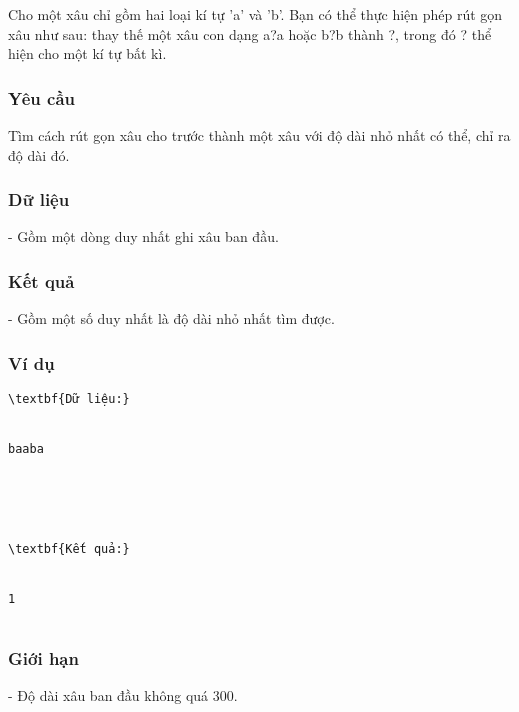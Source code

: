 







   Cho một xâu chỉ gồm hai loại kí tự 'a' và 'b'. Bạn có thể thực hiện phép rút gọn xâu như sau: thay thế một xâu con dạng a?a hoặc b?b thành ?, trong đó ? thể hiện cho một kí tự bất kì.  

\subsubsection{   Yêu cầu  }

   Tìm cách rút gọn xâu cho trước thành một xâu với độ dài nhỏ nhất có thể, chỉ ra độ dài đó.  

\subsubsection{   Dữ liệu  }

   - Gồm một dòng duy nhất ghi xâu ban đầu.  

\subsubsection{   Kết quả  }

   - Gồm một số duy nhất là độ dài nhỏ nhất tìm được.  

\subsubsection{   Ví dụ  }
\begin{verbatim}
\textbf{Dữ liệu:}


baaba





\textbf{Kết quả:}


1


\end{verbatim}

\subsubsection{   Giới hạn  }

   - Độ dài xâu ban đầu không quá 300.  

